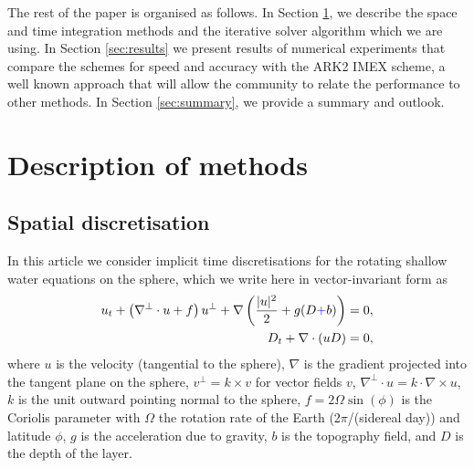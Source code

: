 \documentclass[a4paper, 12pt]{article}
\newcommand{\revisedC}[1]{{\color{blue}#1}}
\begin{document}
The rest of the paper is organised as follows. In Section \ref{sec:methods},
we describe the space and time integration methods and the iterative
solver algorithm which we are using. In Section \ref{sec:results} we
present results of numerical experiments that compare the schemes for
speed and accuracy with the ARK2 IMEX scheme, a well known approach that
will allow the community to relate the performance to other methods.
In Section \ref{sec:summary}, we provide a summary and outlook.

\section{Description of methods}
\label{sec:methods}
\subsection{Spatial discretisation}
In this article we consider implicit time discretisations for the
rotating shallow water equations on the sphere, which we write
here in vector-invariant form as
\begin{align}
  u_t + \left(\nabla^\perp\cdot u + f\right)u^\perp
  + \nabla\left(\frac{|u|^2}{2} + g(D\revisedC{+}b)\right) & = 0, \\
  D_t + \nabla\cdot(uD) & = 0,
\end{align}
where $u$ is the velocity (tangential to the sphere), $\nabla$ is the
gradient projected into the tangent plane on the sphere, $v^\perp =
k\times v$ for vector fields $v$, \revisedC{$\nabla^\perp\cdot u = k \cdot \nabla\times u$,} 
$k$ is the unit outward pointing
normal to the sphere, $f=2\Omega \sin(\phi)$ is the Coriolis parameter
with $\Omega$ the rotation rate of the Earth (2$\pi$/(sidereal day))
and latitude $\phi$, $g$ is the acceleration due to gravity, $b$ is
the topography field, and $D$ is the depth of the layer.
\end{document}
